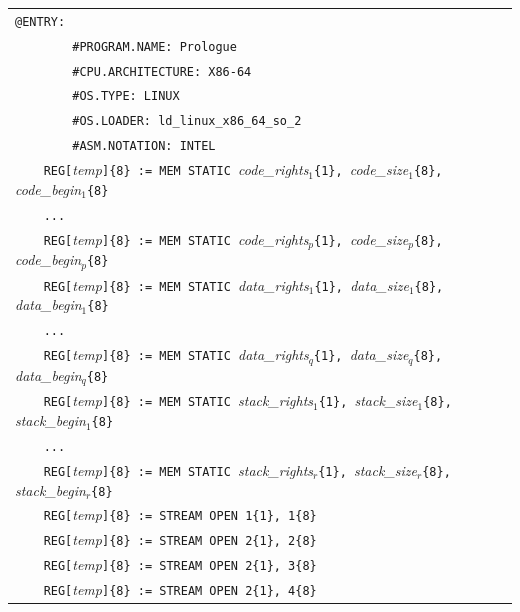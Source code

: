 \documentclass[10pt,twocolumn]{article}
\begin{document}
\begin{table}[!h]
\begin{center}
\begin{tabular}{l}
\texttt{@ENTRY:}\\ %

\texttt{~~~~~~~~\#PROGRAM.NAME: Prologue}\\ %
\texttt{~~~~~~~~\#CPU.ARCHITECTURE: X86-64}\\ %
\texttt{~~~~~~~~\#OS.TYPE: LINUX}\\ %
\texttt{~~~~~~~~\#OS.LOADER: ld\_linux\_x86\_64\_so\_2}\\ %
\texttt{~~~~~~~~\#ASM.NOTATION: INTEL}\\ %

\texttt{~~~~REG[}\textit{temp}\texttt{]\{8\} := MEM STATIC
}\textit{code\_rights}$ _1 $\texttt{\{1\}, }\textit{code\_size}$ _1 $\texttt{\{8\},}
\textit{code\_begin}$ _1 $\texttt{\{8\}}\\ %
\texttt{~~~~...}\\ %
\texttt{~~~~REG[}\textit{temp}\texttt{]\{8\} := MEM STATIC
}\textit{code\_rights}$ _p $\texttt{\{1\}, }\textit{code\_size}$ _p $\texttt{\{8\},}
\textit{code\_begin}$ _p $\texttt{\{8\}}\\ %

\texttt{~~~~REG[}\textit{temp}\texttt{]\{8\} := MEM STATIC
}\textit{data\_rights}$ _1 $\texttt{\{1\}, }\textit{data\_size}$ _1 $\texttt{\{8\},}
\textit{data\_begin}$ _1 $\texttt{\{8\}}\\ %
\texttt{~~~~...}\\ %
\texttt{~~~~REG[}\textit{temp}\texttt{]\{8\} := MEM STATIC
}\textit{data\_rights}$ _q $\texttt{\{1\}, }\textit{data\_size}$ _q $\texttt{\{8\},}
\textit{data\_begin}$ _q $\texttt{\{8\}}\\ %

\texttt{~~~~REG[}\textit{temp}\texttt{]\{8\} := MEM STATIC
}\textit{stack\_rights}$ _1 $\texttt{\{1\}, }\textit{stack\_size}$ _1
$\texttt{\{8\},} \textit{stack\_begin}$ _1 $\texttt{\{8\}}\\ %
\texttt{~~~~...}\\ %
\texttt{~~~~REG[}\textit{temp}\texttt{]\{8\} := MEM STATIC
}\textit{stack\_rights}$ _r $\texttt{\{1\}, }\textit{stack\_size}$ _r
$\texttt{\{8\},} \textit{stack\_begin}$ _r $\texttt{\{8\}}\\ %

\texttt{~~~~REG[}\textit{temp}\texttt{]\{8\} := STREAM OPEN 1\{1\}, 1\{8\}}\\ %
\texttt{~~~~REG[}\textit{temp}\texttt{]\{8\} := STREAM OPEN 2\{1\}, 2\{8\}}\\ %
\texttt{~~~~REG[}\textit{temp}\texttt{]\{8\} := STREAM OPEN 2\{1\}, 3\{8\}}\\ %
\texttt{~~~~REG[}\textit{temp}\texttt{]\{8\} := STREAM OPEN 2\{1\}, 4\{8\}}\\ %


\end{tabular}
\end{center}
\end{table}
\end{document}
